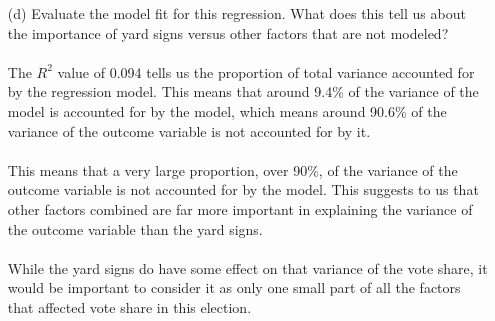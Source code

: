 \documentclass[12pt,letterpaper]{article}
\begin{document}
\begin{enumerate}
	
\newpage	
	\item [(d)] Evaluate the model fit for this regression.  What does this	tell us about the importance of yard signs versus other factors that are not modeled?
\\\\
\noindent The $R^2$ value of 0.094 tells us the proportion of total variance accounted for by the regression model. This means that around 9.4\% of the variance of the model is accounted for by the model, which means around 90.6\% of the variance of the outcome variable is not accounted for by it. 
\\\\
\noindent This means that a very large proportion, over 90\%, of the variance of the outcome variable is not accounted for by the model. This suggests to us that other factors combined are far more important in explaining the variance of the outcome variable than the yard signs.
\\\\
\noindent While the yard signs do have some effect on that variance of the vote share, it would be important to consider it as only one small part of all the factors that affected vote share in this election.
	
\end{enumerate}  
\end{document}
